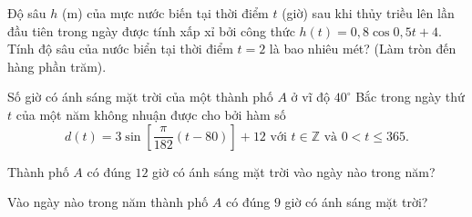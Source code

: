 \begin{bt}%
	Độ sâu $h$ (m) của mực nước biến tại thời điểm $t$ (giờ) sau khi thủy triều lên lần đầu tiên trong ngày được tính xấp xỉ bởi công thức $h(t)=0{,}8\cos 0{,}5t+4$. Tính độ sâu của nước biển tại thời điểm $t=2$ là bao nhiêu mét? (Làm tròn đến hàng phần trăm).
\end{bt}

\begin{bt}%
	Số giờ có ánh sáng mặt trời của một thành phố $A$ ở vĩ độ $40^\circ$ Bắc trong ngày thứ $t$ của một năm không nhuận được cho bởi hàm số
	\[
	d(t)=3\sin \left[\dfrac{\pi}{182}(t-80)\right] +12 \text{ với } t\in \mathbb{Z} \text{ và } 0<t\leq 365.
	\]
	\begin{listEX}[1]
		\item Thành phố $A$ có đúng $12$ giờ có ánh sáng mặt trời vào ngày nào trong năm?
		\item Vào ngày nào trong năm thành phố $A$ có đúng $9$ giờ có ánh sáng mặt trời?
	\end{listEX}
\end{bt}
